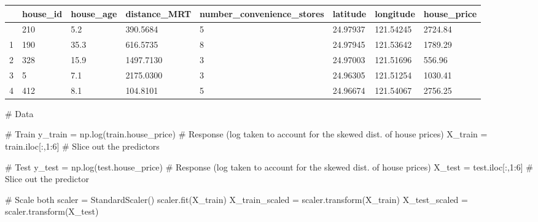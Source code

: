 \documentclass[
  letterpaper,
  DIV=11,
  numbers=noendperiod]{scrreprt}
\newenvironment{Shaded}{\begin{snugshade}}{\end{snugshade}}
\newcommand{\CommentTok}[1]{\textcolor[rgb]{0.37,0.37,0.37}{#1}}
\newcommand{\DecValTok}[1]{\textcolor[rgb]{0.68,0.00,0.00}{#1}}
\newcommand{\NormalTok}[1]{\textcolor[rgb]{0.00,0.23,0.31}{#1}}
\newcommand{\OperatorTok}[1]{\textcolor[rgb]{0.37,0.37,0.37}{#1}}
\begin{document}
\begin{longtable}[]{@{}llllllll@{}}
\toprule\noalign{}
& house\_id & house\_age & distance\_MRT & number\_convenience\_stores &
latitude & longitude & house\_price \\
\midrule\noalign{}
\endhead
\bottomrule\noalign{}
\endlastfoot
0 & 210 & 5.2 & 390.5684 & 5 & 24.97937 & 121.54245 & 2724.84 \\
1 & 190 & 35.3 & 616.5735 & 8 & 24.97945 & 121.53642 & 1789.29 \\
2 & 328 & 15.9 & 1497.7130 & 3 & 24.97003 & 121.51696 & 556.96 \\
3 & 5 & 7.1 & 2175.0300 & 3 & 24.96305 & 121.51254 & 1030.41 \\
4 & 412 & 8.1 & 104.8101 & 5 & 24.96674 & 121.54067 & 2756.25 \\
\end{longtable}

\begin{Shaded}
\begin{Highlighting}[]
\CommentTok{\# Data}

\CommentTok{\# Train}
\NormalTok{y\_train }\OperatorTok{=}\NormalTok{ np.log(train.house\_price) }\CommentTok{\# Response (log taken to account for the skewed dist. of house prices)}
\NormalTok{X\_train }\OperatorTok{=}\NormalTok{ train.iloc[:,}\DecValTok{1}\NormalTok{:}\DecValTok{6}\NormalTok{] }\CommentTok{\# Slice out the predictors}

\CommentTok{\# Test}
\NormalTok{y\_test }\OperatorTok{=}\NormalTok{ np.log(test.house\_price) }\CommentTok{\# Response (log taken to account for the skewed dist. of house prices)}
\NormalTok{X\_test }\OperatorTok{=}\NormalTok{ test.iloc[:,}\DecValTok{1}\NormalTok{:}\DecValTok{6}\NormalTok{] }\CommentTok{\# Slice out the predictor}

\CommentTok{\# Scale both}
\NormalTok{scaler }\OperatorTok{=}\NormalTok{ StandardScaler()}
\NormalTok{scaler.fit(X\_train)}
\NormalTok{X\_train\_scaled }\OperatorTok{=}\NormalTok{ scaler.transform(X\_train)}
\NormalTok{X\_test\_scaled }\OperatorTok{=}\NormalTok{ scaler.transform(X\_test)}
\end{Highlighting}
\end{Shaded}
\end{document}
